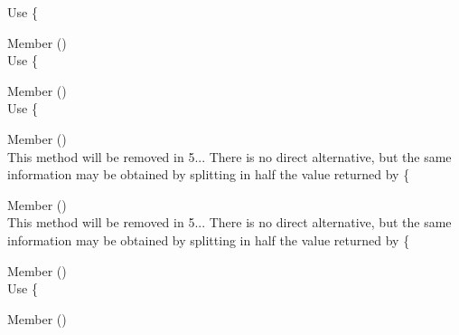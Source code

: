\begin{DoxyRefList}
\label{deprecated__deprecated000290}%
%
Use \{ 
\item[Member \doxylink{class_ramsey_1_1_uuid_1_1_lazy_1_1_lazy_uuid_from_string_a7d6d9e15d4099ba77e36bc651a9d7ab5}{Ramsey\textbackslash{}Uuid\textbackslash{}Lazy\textbackslash{}Lazy\+Uuid\+From\+String\+::get\+Clock\+Seq\+Low} ()]\hfill \\
\label{deprecated__deprecated000291}%
%
Use \{ 
\item[Member \doxylink{class_ramsey_1_1_uuid_1_1_lazy_1_1_lazy_uuid_from_string_abcae35b54357c9c653fcfe642f2ead4e}{Ramsey\textbackslash{}Uuid\textbackslash{}Lazy\textbackslash{}Lazy\+Uuid\+From\+String\+::get\+Clock\+Sequence} ()]\hfill \\
\label{deprecated__deprecated000292}%
%
Use \{ 
\item[Member \doxylink{class_ramsey_1_1_uuid_1_1_lazy_1_1_lazy_uuid_from_string_a578ef050ac31d91a1b5b1e72ee72d739}{Ramsey\textbackslash{}Uuid\textbackslash{}Lazy\textbackslash{}Lazy\+Uuid\+From\+String\+::get\+Least\+Significant\+Bits} ()]\hfill \\
\label{deprecated__deprecated000293}%
%
This method will be removed in 5... There is no direct alternative, but the same information may be obtained by splitting in half the value returned by \{ 
\item[Member \doxylink{class_ramsey_1_1_uuid_1_1_lazy_1_1_lazy_uuid_from_string_add069f650c07ca5be3c6a1e55d82cc12}{Ramsey\textbackslash{}Uuid\textbackslash{}Lazy\textbackslash{}Lazy\+Uuid\+From\+String\+::get\+Most\+Significant\+Bits} ()]\hfill \\
\label{deprecated__deprecated000294}%
%
This method will be removed in 5... There is no direct alternative, but the same information may be obtained by splitting in half the value returned by \{ 
\item[Member \doxylink{class_ramsey_1_1_uuid_1_1_lazy_1_1_lazy_uuid_from_string_af21e16bce88b886f958e06c12f5f7cc7}{Ramsey\textbackslash{}Uuid\textbackslash{}Lazy\textbackslash{}Lazy\+Uuid\+From\+String\+::get\+Node} ()]\hfill \\
\label{deprecated__deprecated000295}%
%
Use \{ 
\item[Member \doxylink{class_ramsey_1_1_uuid_1_1_lazy_1_1_lazy_uuid_from_string_a034928e81085f5a30de601de533cea29}{Ramsey\textbackslash{}Uuid\textbackslash{}Lazy\textbackslash{}Lazy\+Uuid\+From\+String\+::get\+Time\+Hi\+And\+Version} ()]\hfill \\

\end{DoxyRefList}
